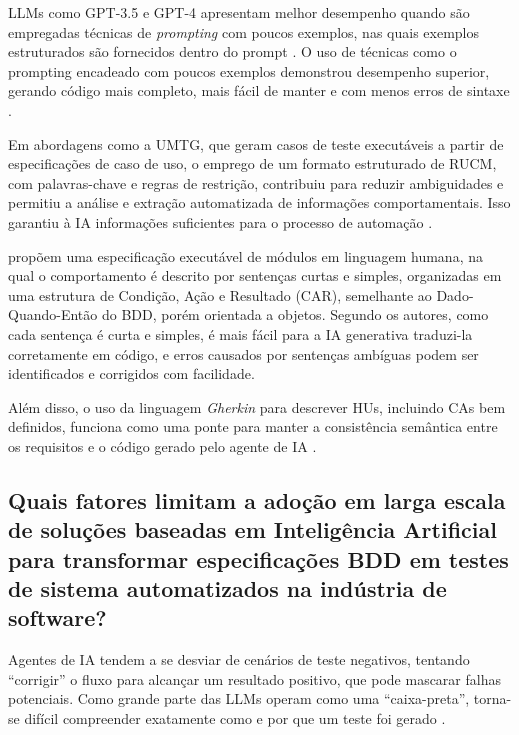 LLMs como GPT-3.5 e GPT-4 apresentam melhor desempenho quando são empregadas técnicas de \textit{prompting} com poucos exemplos, nas quais exemplos estruturados são fornecidos dentro do prompt \cite{Karpurapu2024}. O uso de técnicas como o prompting encadeado com poucos exemplos demonstrou desempenho superior, gerando código mais completo, mais fácil de manter e com menos erros de sintaxe \cite{Nettur2025}.

Em abordagens como a UMTG, que geram casos de teste executáveis a partir de especificações de caso de uso, o emprego de um formato estruturado de RUCM, com palavras-chave e regras de restrição, contribuiu para reduzir ambiguidades e permitiu a análise e extração automatizada de informações comportamentais. Isso garantiu à IA informações suficientes para o processo de automação \cite{Wang2022}.

 propõem uma especificação executável de módulos em linguagem humana, na qual o comportamento é descrito por sentenças curtas e simples, organizadas em uma estrutura de Condição, Ação e Resultado (CAR), semelhante ao Dado-Quando-Então do BDD, porém orientada a objetos. Segundo os autores, como cada sentença é curta e simples, é mais fácil para a IA generativa traduzi-la corretamente em código, e erros causados por sentenças ambíguas podem ser identificados e corrigidos com facilidade.

Além disso, o uso da linguagem \textit{Gherkin} para descrever HUs, incluindo CAs bem definidos, funciona como uma ponte para manter a consistência semântica entre os requisitos e o código gerado pelo agente de IA \cite{Zhang2025}.


\subsection{Quais fatores limitam a adoção em larga escala de soluções baseadas em Inteligência Artificial para transformar especificações BDD em testes de sistema automatizados na indústria de software?}

Agentes de IA tendem a se desviar de cenários de teste negativos, tentando “corrigir” o fluxo para alcançar um resultado positivo, que pode mascarar falhas potenciais. Como grande parte das LLMs operam como uma “caixa-preta”, torna-se difícil compreender exatamente como e por que um teste foi gerado \cite{Pysmennyi2025}.

